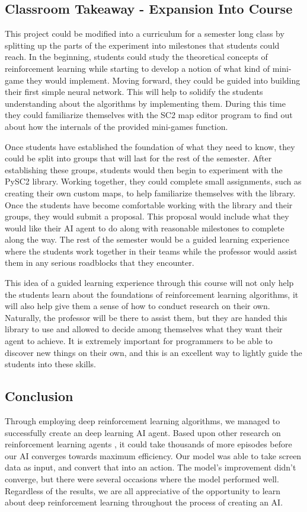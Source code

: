 \documentclass[12pt]{article}
\begin{document}
%
%
\subsection*{Classroom Takeaway - Expansion Into Course}

This project could be modified into a curriculum for a semester long class by splitting up the parts of the experiment into milestones that students could reach. In the beginning, students could study the theoretical concepts of reinforcement learning while starting to develop a notion of what kind of mini-game they would implement. Moving forward, they could be guided into building their first simple neural network. This will help to solidify the students understanding about the algorithms by implementing them. During this time they could familiarize themselves with the SC2 map editor program to find out about how the internals of the provided mini-games function. 

Once students have established the foundation of what they need to know, they could be split into groups that will last for the rest of the semester. After establishing these groups, students would then begin to experiment with the PySC2 library. Working together, they could complete small assignments, such as creating their own custom maps, to help familiarize themselves with the library. Once the students have become comfortable working with the library and their groups, they would submit a proposal. This proposal would include what they would like their AI agent to do along with reasonable milestones to complete along the way. The rest of the semester would be a guided learning experience where the students work together in their teams while the professor would assist them in any serious roadblocks that they encounter.

This idea of a guided learning experience through this course will not only help the students learn about the foundations of reinforcement learning algorithms, it will also help give them a sense of how to conduct research on their own. Naturally, the professor will be there to assist them, but they are handed this library to use and allowed to decide among themselves what they want their agent to achieve. It is extremely important for programmers to be able to discover new things on their own, and this is an excellent way to lightly guide the students into these skills.  


\subsection*{Conclusion}
Through employing deep reinforcement learning algorithms, we managed to successfully create an deep learning AI agent. Based upon other research on reinforcement learning agents \cite{Vinyals2017StarCraftIA}, it could take thousands of more episodes before our AI converges towards maximum efficiency. Our model was able to take screen data as input, and convert that into an action. The model's improvement didn't converge, but there were several occasions where the model performed well.  Regardless of the results, we are all appreciative of the opportunity to learn about deep reinforcement learning throughout the process of creating an AI.

\newpage


\end{document}
